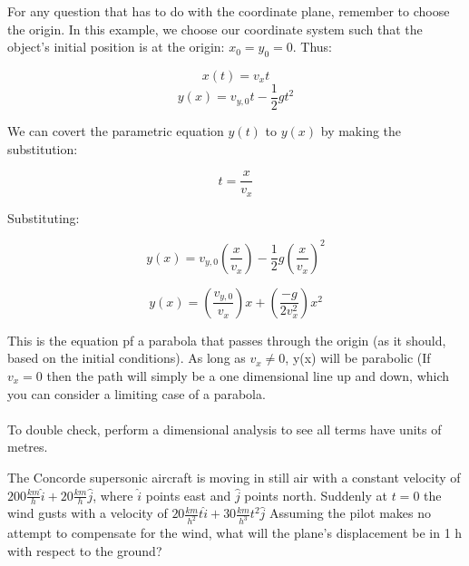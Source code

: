 \begin{solution}
For any question that has to do with the coordinate plane, remember to choose the origin. In this example, we choose our coordinate system such that the object's initial position is at the origin: $x_0=y_0=0$. Thus:

\begin{equation*} x(t)=v_xt\end{equation*}
\begin{equation*} y(x)=v_{y,0}t-\frac{1}{2}gt^2\end{equation*}

We can covert the parametric equation $y(t)$ to $y(x)$ by making the substitution:

\begin{equation*} t=\frac{x}{v_x} \end{equation*}

Substituting: 

\begin{equation*}
    y(x) = v_{y,0}(\frac{x}{v_x})-\frac{1}{2}g(\frac{x}{v_x})^2
\end{equation*}

\begin{equation*}
    y(x) = (\frac{v_{y,0}}{v_x})x+(\frac{-g}{2v_x^2})x^2
\end{equation*}

This is the equation pf a parabola that passes through the origin (as it should, based on the initial conditions). As long as $v_x \neq 0$, y(x) will be parabolic (If $v_x = 0$ then the path will simply be a one dimensional line up and down, which you can consider a limiting case of a parabola.
\\\\
To double check, perform a dimensional analysis to see all terms have units of metres.

\end{solution}


\begin{question}
The Concorde supersonic aircraft is moving in still air with a constant velocity of $200\frac{km}{h}\hat{i}+20\frac{km}{h}\hat{j}$, where $\hat{i}$ points east and $\hat{j}$ points north. Suddenly at $t=0$ the wind gusts with a velocity of $20\frac{km}{h^2}t\hat{i}+30\frac{km}{h^3}t^2\hat{j}$ Assuming the pilot makes no attempt to compensate for the wind, what will the plane's displacement be in 1 h with respect to the ground?
\end{question}

